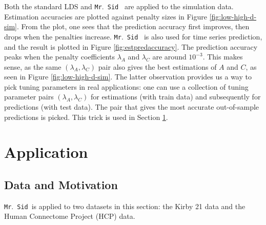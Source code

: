 \documentclass[fleqn,12pt]{article}
\let\oldref\ref
\renewcommand{\ref}[1]{(\oldref{#1})}
\newcommand{\mrsid}{{\sc \texttt{Mr}.~\texttt{Sid}}}
\begin{document}
Both the standard LDS and \mrsid~  are applied to the simulation data. Estimation accuracies are plotted against penalty sizes in Figure \oldref{fig:low-high-d-sim}. From the plot, one sees that the prediction accuracy first improves, then drops when the penalties increase. \mrsid~  is also used for time series prediction, and the result is plotted in Figure \oldref{fig:estpredaccuracy}. The prediction accuracy peaks when the penalty coefficients $\lambda_A$ and $\lambda_C$ are around $10^{-3}$. This makes sense, as the same $(\lambda_A,\lambda_C)$ pair also gives the best estimations of $A$ and $C$, as seen in Figure \oldref{fig:low-high-d-sim}. The latter observation provides us a way to pick tuning parameters in real applications: one can use a collection of tuning parameter pairs $(\lambda_A,\lambda_C)$ for estimations (with train data) and subsequently for predictions (with test data). The pair that gives the most accurate out-of-sample predictions is picked. This trick is used in Section \oldref{sec:application}.
%
%
%
%
%
%
%
%

\section{Application}
\label{sec:application}

\subsection{Data and Motivation}

\mrsid~is applied to two datasets in this section: the Kirby 21 data and the Human Connectome Project (HCP) data.
\end{document}
